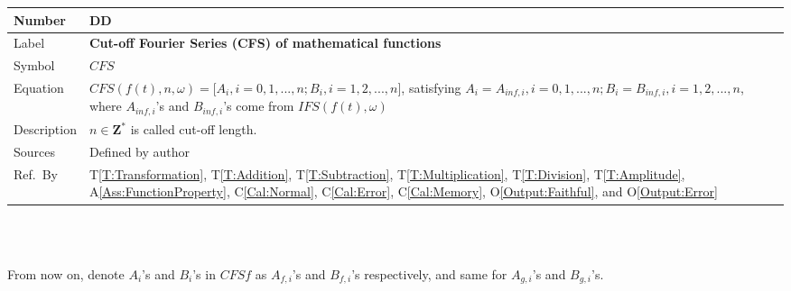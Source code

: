 \documentclass[12pt]{article}
\newcommand{\colAwidth}{0.13\textwidth}
\newcommand{\colBwidth}{0.82\textwidth}
\newcounter{defnum} %
\newcounter{datadefnum} %
\newcommand{\tref}[1]{T\ref{#1}}
\newcommand{\aref}[1]{A\ref{#1}}
\newcommand{\calref}[1]{C\ref{#1}}
\newcommand{\oref}[1]{O\ref{#1}}
\begin{document}
\noindent
\begin{minipage}{\textwidth}
	\renewcommand*{\arraystretch}{1.5}
	\begin{tabular}{| p{\colAwidth} | p{\colBwidth}|}
		\hline
		\rowcolor[gray]{0.9}
		Number& DD{datadefnum}\thedatadefnum \label{DD:CFS}\\
		\hline
		Label& \bf Cut-off Fourier Series (CFS) of mathematical functions\\
		\hline
		Symbol &$\mathit{CFS}$\\
		\hline
		Equation&$\mathit{CFS}(f(t), n, \omega)=\big[A_i, i=0, 1, ..., n; B_i, i=1, 2, ..., n\big]$, satisfying $A_i=A_{inf, i}, i=0, 1, ..., n; B_i=B_{inf, i}, i=1, 2, ..., n$, where $A_{inf, i}$'s and $B_{inf, i}$'s come from $\mathit{IFS}(f(t), \omega)$ \\
		\hline
		Description & $n\in \mathbf{Z}^{*}$ is called cut-off length.\\
		\hline
		Sources& Defined by author\\
		\hline
		Ref.\ By & \tref{T:Transformation}, \tref{T:Addition}, \tref{T:Subtraction}, \tref{T:Multiplication}, \tref{T:Division}, \tref{T:Amplitude}, \aref{Ass:FunctionProperty},  \calref{Cal:Normal}, \calref{Cal:Error}, \calref{Cal:Memory}, \oref{Output:Faithful}, and \oref{Output:Error}\\
		\hline
	\end{tabular}
\end{minipage}\\
~\newline

From now on, denote $A_i$'s and $B_i$'s in $\mathit{CFSf}$ as $A_{f, i}$'s and $B_{f, i}$'s respectively, and same for $A_{g, i}$'s and $B_{g, i}$'s.
~\newline
\end{document}
